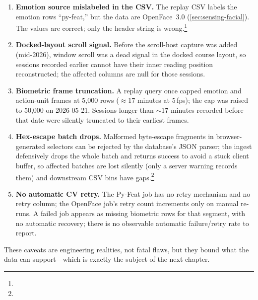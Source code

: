 \begin{enumerate}
  \item \textbf{Emotion source mislabeled in the CSV.} The replay CSV
  labels the emotion rows ``py-feat,'' but the data are OpenFace~3.0
  (\cref{sec:sensing-facial}). The values are correct; only the header
  string is wrong.\footnote{}
  \item \textbf{Docked-layout scroll signal.} Before the scroll-host
  capture was added (mid-2026), window scroll was a dead signal in the
  docked course layout, so sessions recorded earlier cannot have their
  inner reading position reconstructed; the affected columns are null for
  those sessions. 
  \item \textbf{Biometric frame truncation.} A replay query once capped
  emotion and action-unit frames at 5{,}000 rows ($\approx$17 minutes at
  5\,fps); the cap was raised to 50{,}000 on 2026-05-21. Sessions longer
  than $\sim$17 minutes recorded before that date were silently truncated
  to their earliest frames. 
  \item \textbf{Hex-escape batch drops.} Malformed byte-escape fragments
  in browser-generated selectors can be rejected by the database's JSON
  parser; the ingest defensively drops the whole batch and returns success
  to avoid a stuck client buffer, so affected batches are lost silently
  (only a server warning records them) and downstream CSV bins have
  gaps.\footnote{}
  \item \textbf{No automatic CV retry.} The Py-Feat job has no retry
  mechanism and no retry column; the OpenFace job's retry count increments
  only on manual re-runs. A failed job appears as missing biometric rows
  for that segment, with no automatic recovery; there is no observable
  automatic failure/retry rate to report.
\end{enumerate}

\medskip
\noindent These caveats are engineering realities, not fatal flaws, but
they bound what the data can support---which is exactly the subject of the
next chapter.
